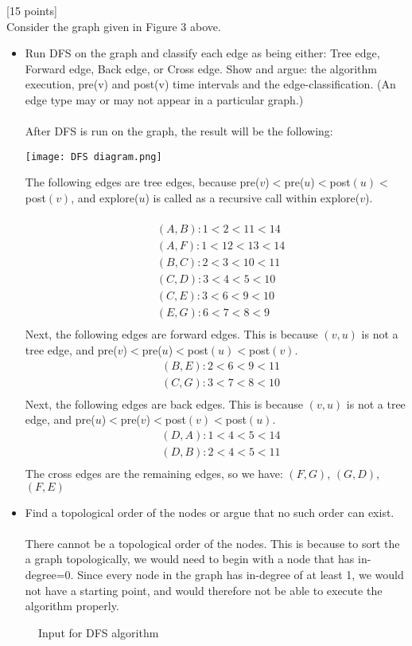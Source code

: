 \documentclass[12pt]{article}
\newcounter{ques}
\newenvironment{question}{\stepcounter{ques}{\noindent\bf Question \arabic{ques}:}}{\vspace{5mm}}
\begin{document}
\begin{question}[15 points]\\
Consider the graph given in Figure 3 above.
\begin{itemize}
	\item Run DFS on the graph and classify each edge as being either: Tree edge, Forward edge, Back edge, or Cross edge. Show and argue: the algorithm execution,   pre(v) and post(v) time intervals and the edge-classification. (An edge type may or may not appear in a particular graph.)\\\\
  After DFS is run on the graph, the result will be the following:\\
  \begin{center}
    \texttt{[image: DFS diagram.png]}
  \end{center}
  The following edges are tree edges, because pre($v$)$<$pre($u$)$<$post$(u)<$post$(v)$, and explore($u$) is called as a recursive call within explore($v$).\\\\
  \begin{align*}
    &(A,B):  1 < 2 < 11 < 14\\
    &(A,F):  1 < 12 < 13 < 14\\
    &(B,C):  2 < 3 < 10 < 11\\
    &(C,D):  3 < 4 < 5 < 10\\
    &(C,E):  3 < 6 < 9 < 10\\
    &(E,G):  6 < 7 < 8 < 9\\
  \end{align*}
  Next, the following edges are forward edges. This is because $(v,u)$ is not a tree edge, and pre($v$)$<$pre($u$)$<$post$(u)<$post$(v)$.
  \begin{align*}
    &(B,E):  2 < 6 < 9 < 11\\
    &(C,G):  3 < 7 < 8 < 10\\
  \end{align*}
  Next, the following edges are back edges. This is because $(v,u)$ is not a tree edge, and pre($u$)$<$pre($v$)$<$post$(v)<$post$(u)$.
  \begin{align*}
    &(D,A):  1 < 4 < 5 < 14\\
    &(D,B):  2 < 4 < 5 < 11\\
  \end{align*}
  The cross edges are the remaining edges, so we have:
  $(F,G)$, $(G,D)$, $(F,E)$

	\item Find a topological order of the nodes or argue that no such order can exist.\\\\
  There cannot be a topological order of the nodes. This is because to sort the a graph topologically, we would need to begin with a node that has in-degree=0. Since every node in the graph has in-degree of at least 1, we would not have a starting point, and would therefore not be able to execute the algorithm properly.
\end{itemize}



\begin{figure}
	\centerline{}
	\caption{Input for DFS algorithm}
	\label{fig:DFSinput}
\end{figure}

\end{question}
\end{document}
